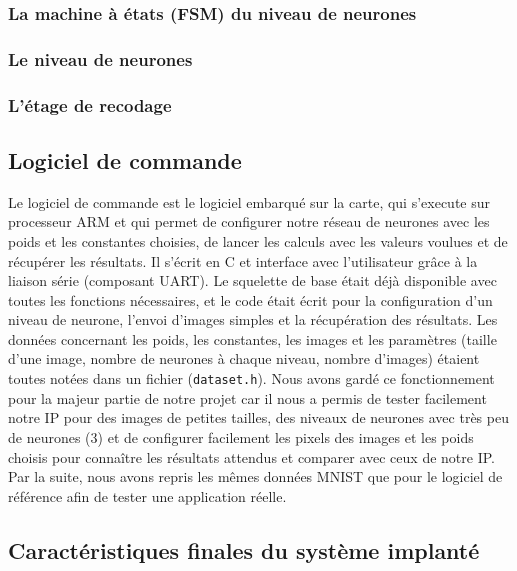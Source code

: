 \subsubsection{La machine à états (FSM) du niveau de neurones}
\subsubsection{Le niveau de neurones}
\subsubsection{L'étage de recodage}

\subsection{Logiciel de commande}
Le logiciel de commande est le logiciel embarqué sur la carte, qui s'execute
sur processeur ARM et qui permet de configurer notre réseau de neurones avec
les poids et les constantes choisies, de lancer les calculs avec les valeurs
voulues et de récupérer les résultats. Il s'écrit en C et interface avec
l'utilisateur grâce à la liaison série (composant UART). Le squelette de base
était déjà disponible avec toutes les fonctions nécessaires, et le code était
écrit pour la configuration d'un niveau de neurone, l'envoi d'images simples et
la récupération des résultats.
Les données
concernant les poids, les constantes, les images et les paramètres (taille d'une
image, nombre de neurones à chaque niveau, nombre d'images) étaient toutes notées
dans un fichier (\texttt{dataset.h}). Nous avons gardé ce fonctionnement pour la
majeur partie de notre projet car il nous a permis de tester facilement notre
IP pour des images de petites tailles, des niveaux de neurones avec très peu
de neurones (3) et de configurer facilement les pixels des images et les poids
choisis pour connaître les résultats attendus et comparer avec ceux de notre IP.
Par la suite, nous avons repris les mêmes données MNIST que pour le logiciel de
référence afin de tester une application réelle. \\

\subsection{Caractéristiques finales du système implanté}
























